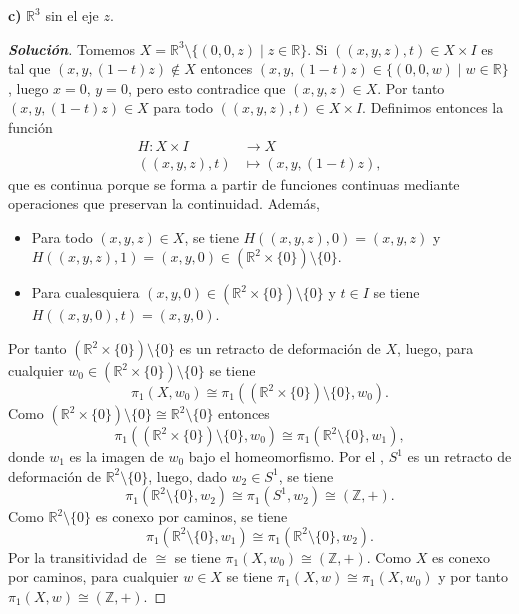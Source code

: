 \textbf{c)} $\mathbb{R}^3$ sin el eje $z$.
\begin{proof}[\textbf{Solución}]
Tomemos $X=\mathbb{R}^3\setminus\{(0,0,z)\mid z\in\mathbb{R}\}$. Si $((x,y,z),t)\in X\times I$ es tal que $(x,y,(1-t)z)\notin X$ entonces $(x,y,(1-t)z)\in\{(0,0,w)\mid w\in\mathbb{R}\}$, luego $x=0$, $y=0$, pero esto contradice que $(x,y,z)\in X$. Por tanto $(x,y,(1-t)z)\in X$ para todo $((x,y,z),t)\in X\times I$. Definimos entonces la función
\begin{align*}
H:X\times I&\longrightarrow X\\
((x,y,z),t)&\longmapsto(x,y,(1-t)z),
\end{align*}
que es continua porque se forma a partir de funciones continuas mediante operaciones que preservan la continuidad. Además,
\begin{itemize}
\item Para todo $(x,y,z)\in X$, se tiene $H((x,y,z),0)=(x,y,z)$ y $H((x,y,z),1)=(x,y,0)\in(\mathbb{R}^2\times\{0\})\setminus\{0\}$.
\item Para cualesquiera $(x,y,0)\in(\mathbb{R}^2\times\{0\})\setminus\{0\}$ y $t\in I$ se tiene $H((x,y,0),t)=(x,y,0)$.
\end{itemize}
Por tanto $(\mathbb{R}^2\times\{0\})\setminus\{0\}$ es un retracto de deformación de $X$, luego, para cualquier $w_0\in(\mathbb{R}^2\times\{0\})\setminus\{0\}$ se tiene
\[
\pi_1(X,w_0)\cong\pi_1((\mathbb{R}^2\times\{0\})\setminus\{0\},w_0).
\]
Como $(\mathbb{R}^2\times\{0\})\setminus\{0\}\cong\mathbb{R}^2\setminus\{0\}$ entonces
\[
\pi_1((\mathbb{R}^2\times\{0\})\setminus\{0\},w_0)\cong\pi_1(\mathbb{R}^2\setminus\{0\},w_1),
\]
donde $w_1$ es la imagen de $w_0$ bajo el homeomorfismo. Por el , $S^1$ es un retracto de deformación de $\mathbb{R}^2\setminus\{0\}$, luego, dado $w_2\in S^1$, se tiene
\[
\pi_1(\mathbb{R}^2\setminus\{0\},w_2)\cong\pi_1(S^1,w_2)\cong(\mathbb{Z},+).
\]
Como $\mathbb{R}^2\setminus\{0\}$ es conexo por caminos, se tiene
\[
\pi_1(\mathbb{R}^2\setminus\{0\},w_1)\cong\pi_1(\mathbb{R}^2\setminus\{0\},w_2).
\]
Por la transitividad de $\cong$ se tiene $\pi_1(X,w_0)\cong(\mathbb{Z},+)$. Como $X$ es conexo por caminos, para cualquier $w\in X$ se tiene $\pi_1(X,w)\cong\pi_1(X,w_0)$ y por tanto $\pi_1(X,w)\cong(\mathbb{Z},+)$.
\end{proof}
